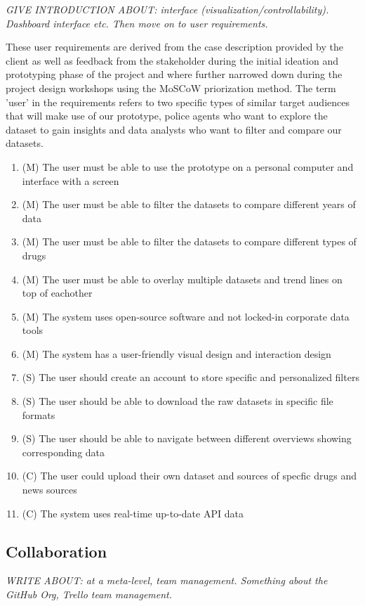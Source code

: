  \textit{GIVE INTRODUCTION ABOUT:  interface (visualization/controllability). Dashboard interface etc. Then move on to user requirements.}

These user requirements are derived from the case description provided by the client as well as feedback from the stakeholder during the initial ideation and prototyping phase of the project and where further narrowed down during the project design workshops using the MoSCoW priorization method. The term 'user' in the requirements refers to two specific types of similar target audiences that will make use of our prototype, police agents who want to explore the dataset to gain insights and data analysts who want to filter and compare our datasets.

 \begin{enumerate}
   \item (M) The user must be able to use the prototype on a personal computer and interface with a screen
   \item (M) The user must be able to filter the datasets to compare different years of data
   \item (M) The user must be able to filter the datasets to compare different types of drugs
   \item (M) The user must be able to overlay multiple datasets and trend lines on top of eachother
   \item (M) The system uses open-source software and not locked-in corporate data tools
   \item (M) The system has a user-friendly visual design and interaction design
   \item (S) The user should create an account to store specific and personalized filters
   \item (S) The user should be able to download the raw datasets in specific file formats
   \item (S) The user should be able to navigate between different overviews showing corresponding data
   \item (C) The user could upload their own dataset and sources of specfic drugs and news sources
   \item (C) The system uses real-time up-to-date API data
 \end{enumerate}

 \subsection{Collaboration}

 \textit{WRITE ABOUT: at a meta-level, team management. Something about the GitHub Org, Trello team management.}